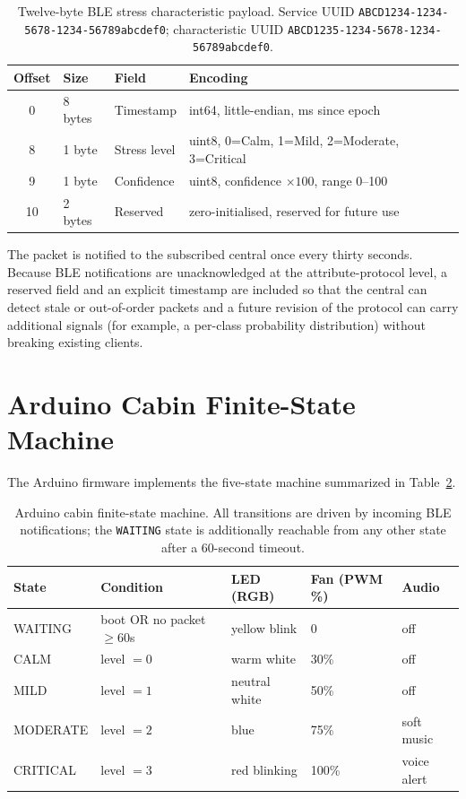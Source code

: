 \begin{table}[H]
\centering
\caption{Twelve-byte BLE stress characteristic payload. Service UUID
\texttt{ABCD1234-1234-5678-1234-56789abcdef0}; characteristic UUID
\texttt{ABCD1235-1234-5678-1234-56789abcdef0}.}
\label{tab:ble-packet}
\small
\begin{tabular}{clll}
\toprule
\textbf{Offset} & \textbf{Size} & \textbf{Field} & \textbf{Encoding} \\
\midrule
0  & 8 bytes & Timestamp      & int64, little-endian, ms since epoch \\
8  & 1 byte  & Stress level   & uint8, 0=Calm, 1=Mild, 2=Moderate, 3=Critical \\
9  & 1 byte  & Confidence     & uint8, confidence $\times 100$, range 0--100 \\
10 & 2 bytes & Reserved       & zero-initialised, reserved for future use \\
\bottomrule
\end{tabular}
\end{table}

The packet is notified to the subscribed central once every thirty
seconds. Because BLE notifications are unacknowledged at the
attribute-protocol level, a reserved field and an explicit timestamp
are included so that the central can detect stale or out-of-order
packets and a future revision of the protocol can carry additional
signals (for example, a per-class probability distribution) without
breaking existing clients.

\section{Arduino Cabin Finite-State Machine}
\label{sec:m-fsm}

The Arduino firmware implements the five-state machine summarized
in Table~\ref{tab:fsm}.

\begin{table}[H]
\centering
\caption{Arduino cabin finite-state machine. All transitions are driven
by incoming BLE notifications; the \texttt{WAITING} state is additionally
reachable from any other state after a 60-second timeout.}
\label{tab:fsm}
\small
\begin{tabular}{lp{3.5cm}lll}
\toprule
\textbf{State} & \textbf{Condition} & \textbf{LED (RGB)} &
\textbf{Fan (PWM \%)} & \textbf{Audio} \\
\midrule
WAITING  & boot OR no packet $\ge 60$s & yellow blink & 0    & off \\
CALM     & level $= 0$                 & warm white   & 30\% & off \\
MILD     & level $= 1$                 & neutral white & 50\% & off \\
MODERATE & level $= 2$                 & blue          & 75\% & soft music \\
CRITICAL & level $= 3$                 & red blinking  & 100\% & voice alert \\
\bottomrule
\end{tabular}
\end{table}

